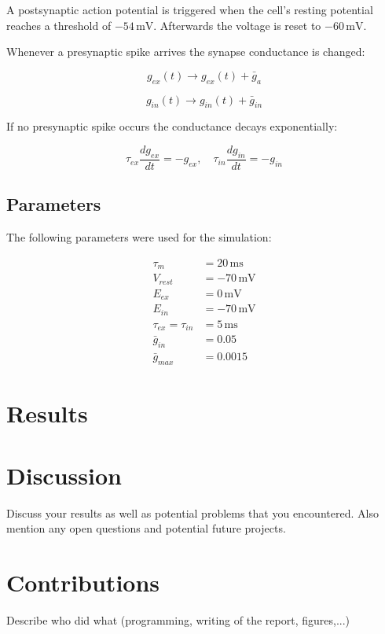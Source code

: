 \documentclass[a4paper,12pt,oneside]{article}
\newcommand{\unit}[1]{\ensuremath{\, \mathrm{#1}}}
\begin{document}
A postsynaptic action potential is triggered when the cell's resting
potential reaches a threshold of $-54\unit{mV}$. Afterwards the
voltage is reset to $-60\unit{mV}$.

Whenever a presynaptic spike arrives the synapse conductance is changed:

\[
g_{ex}(t) \rightarrow g_{ex}(t)+\bar{g}_{a}
\]

\[
g_{in}(t) \rightarrow g_{in}(t)+\bar{g}_{in}
\]

If no presynaptic spike occurs the conductance decays exponentially:

\[
\tau_{ex} \frac{dg_{ex}}{dt} = -g_{ex},\hspace{1em} \tau_{in} \frac{dg_{in}}{dt} = -g_{in}
\]

\subsection{Parameters}

The following parameters were used for the simulation:

\begin{align*}
  \tau_m &= 20\unit{ms} \\
  V_{rest} &= -70\unit{mV} \\
  E_{ex} &= 0\unit{mV} \\
  E_{in} &= -70\unit{mV} \\
  \tau_{ex} = \tau_{in} &= 5\unit{ms} \\
  \bar{g}_{in} &= 0.05 \\
  \bar{g}_{max} &= 0.0015
\end{align*}

\section{Results}

\section{Discussion}

Discuss your results as well as potential problems that you
encountered. Also mention any open questions and potential future projects.

\section{Contributions}
Describe who did what (programming, writing of the report, figures,...)

\newpage


\end{document}
